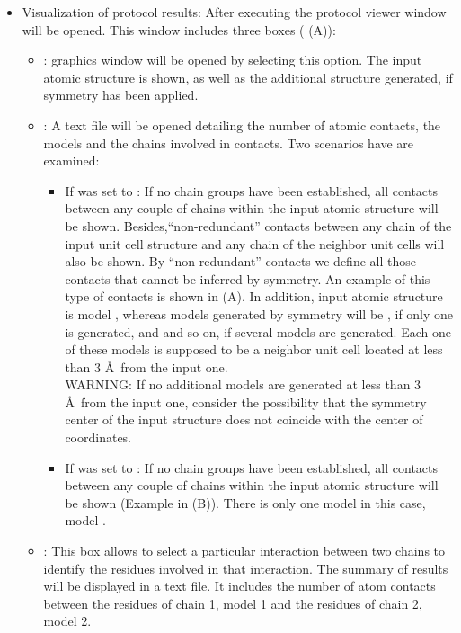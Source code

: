 \begin{itemize}
  \item Visualization of protocol results:
  After executing the protocol  viewer window will be opened. This window includes three boxes ( (A)):
        \begin{itemize}
        \item {}: \chimera graphics window will be opened by selecting this option. The input atomic structure is shown, as well as the additional structure generated, if symmetry has been applied.
        \item {}: A text file will be opened detailing the number of atomic contacts, the models and the chains involved in contacts. Two scenarios have are examined:
            \begin{itemize}
            \item If  was set to : If no chain groups have been established, all contacts between any couple of chains within the input atomic structure will be shown. Besides,``non-redundant'' contacts between any chain of the input unit cell structure and any chain of the neighbor unit cells will also be shown. By ``non-redundant'' contacts we define all those contacts that cannot be inferred by symmetry. An example of this type of contacts is shown in  (A). In addition, input atomic structure is model , whereas models generated by symmetry will be , if only one is generated, and  and so on, if several models are generated. Each one of these models is supposed to be a neighbor unit cell located at less than 3 \AA\ from the input one.\\
            WARNING: If no additional models are generated at less than 3 \AA\ from the input one, consider the possibility that the symmetry center of the input structure does not coincide with the center of coordinates.
            \item If  was set to : If no chain groups have been established, all contacts between any couple of chains within the input atomic structure will be shown (Example in  (B)). There is only one model in this case, model .
            \end{itemize}
        \item {}: This box allows to select a particular interaction between two chains to identify the residues involved in that interaction. The summary of results will be displayed in a text file. It includes the number of atom contacts between the residues of chain 1, model 1 and the residues of chain 2, model 2.

\end{itemize}
\end{itemize}
